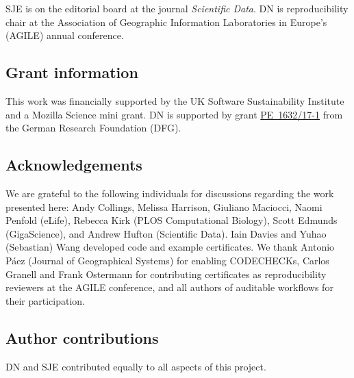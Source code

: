 \documentclass[12pt]{article}
\begin{document}
SJE is on the editorial board at the journal \emph{Scientific Data}.
DN is reproducibility chair at the Association of Geographic
Information Laboratories in Europe's (AGILE) annual conference.

\subsection*{Grant information}

This work was financially supported by the UK Software
Sustainability Institute and a Mozilla Science mini grant.
DN is supported by grant
\href{https://gepris.dfg.de/gepris/projekt/415851837}{PE~1632/17-1}
from the German Research Foundation (DFG).

\subsection*{Acknowledgements}\label{acknowledgements}

We are grateful to the following individuals for discussions regarding
the work presented here: Andy Collings, Melissa Harrison, Giuliano
Maciocci, Naomi Penfold (eLife), Rebecca Kirk (PLOS Computational Biology), Scott
Edmunds (GigaScience), and Andrew Hufton (Scientific Data). Iain Davies and
Yuhao (Sebastian) Wang developed code and example certificates.
We thank Antonio P\'{a}ez (Journal of Geographical Systems) for enabling
CODECHECKs, Carlos Granell and Frank Ostermann for contributing
certificates as reproducibility reviewers at the AGILE conference, and 
all authors of auditable workflows for their participation.

\subsection*{Author contributions}

DN and SJE contributed equally to all aspects of this project.

{\small
}
\end{document}
